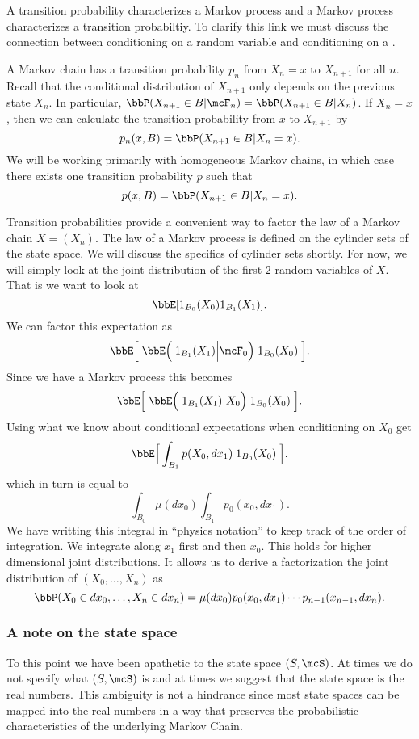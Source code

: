 \documentclass{report}
\begin{document}
A transition probability characterizes a Markov process and a Markov process characterizes a transition probabiltiy.  To clarify this link we must discuss the connection between conditioning on a random variable and conditioning on a \sigalg.

\begin{fact}
A Markov chain has a transition probability $p_n$ from $X_n = x$ to $X_{n+1}$ for all $n$.  Recall that the conditional distribution of $X_{n+1}$ only depends on the previous state $X_n$.  In particular, $\bbP(X_{n+1} \in B | \mcF_n) = \bbP(X_{n+1} \in B | X_n)$.  If $X_n = x$, then we can calculate the transition probability from $x$ to $X_{n+1}$ by
\[
p_n(x,B) = \bbP(X_{n+1} \in B | X_n = x).
\]
We will be working primarily with homogeneous Markov chains, in which case there exists one transition probability $p$ such that
\[
p(x,B) = \bbP(X_{n+1} \in B | X_n = x).
\]
\end{fact}

Transition probabilities provide a convenient way to factor the law of a Markov chain $X = (X_n)$.  The law of a Markov process is defined on the cylinder sets of the state space.  We will discuss the specifics of cylinder sets shortly.  For now, we will simply look at the joint distribution of the first $2$ random variables of $X$.  That is we want to look at 
\[
\bbE[ 1_{B_0}(X_0) 1_{B_1}(X_1) ].
\]
We can factor this expectation as
\[
\bbE \Big[ \; \bbE \Big( \; 1_{B_{1}}(X_{1}) \Big| \mcF_{0} \Big) \; 1_{B_0}(X_0) \; \Big].
\]
Since we have a Markov process this becomes
\[
\bbE \Big[ \; \bbE \Big( \; 1_{B_{1}}(X_{1}) \Big| X_{0} \Big) \; 1_{B_0}(X_0) \; \Big].
\]
Using what we know about conditional expectations when conditioning on $X_0$ get
\[
\bbE \Big[ \int_{B_1} p(X_0, dx_1) \; 1_{B_0}(X_0) \; \Big].
\]
which in turn is equal to
\[
\int_{B_0} \mu(dx_0) \int_{B_1} p_0(x_0, dx_1).
\]
We have writting this integral in ``physics notation'' to keep track of the order of integration.  We integrate along $x_1$ first and then $x_0$.  This holds for higher dimensional joint distributions.  It allows us to derive a factorization the joint distribution of $(X_0, \ldots, X_n)$ as
\[
\bbP(X_0 \in dx_0, \ldots, X_n \in dx_n) = \mu(dx_0) p_0(x_0, dx_1) \cdots p_{n-1}(x_{n-1}, dx_n).
\]

\subsubsection{A note on the state space}

To this point we have been apathetic to the state space $(S, \mcS)$.  At times we do not specify what $(S, \mcS)$ is and at times we suggest that the state space is the real numbers.  This ambiguity is not a hindrance since most state spaces can be mapped into the real numbers in a way that preserves the probabilistic characteristics of the underlying Markov Chain.
\end{document}
